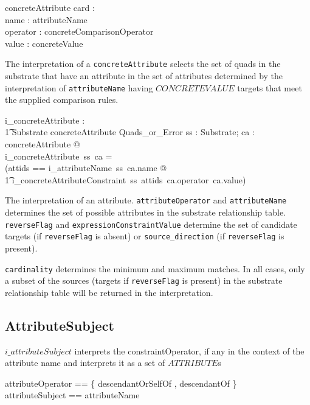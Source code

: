 \documentclass{article}
\def\spec#1{{\tt #1}}
\begin{document}
\begin{schema}{concreteAttribute}
	card : \optional[cardinality] \\
	name : attributeName \\
	operator : concreteComparisonOperator \\
	value : concreteValue
\end{schema}


The interpretation of a \spec{concreteAttribute} selects the set of quads in the substrate that have an attribute in the set of attributes 
determined by the interpretation of \spec{attributeName} having $CONCRETEVALUE$ targets that meet the supplied comparison rules.

\begin{gendef}
   i\_concreteAttribute : \\
\t1 Substrate \fun concreteAttribute \fun Quads\_or\_Error
\where
   \forall ss : Substrate; ca : concreteAttribute @ \\
   i\_concreteAttribute~ss~ca = \\
   (\LET attids == i\_attributeName~ss~ca.name @ \\
\t1 i\_concreteAttributeConstraint~ss~attids~ca.operator~ca.value)
\end{gendef}




   
   


The interpretation of an attribute.  \spec{attributeOperator} and \spec{attributeName}
determines the set of possible attributes in the substrate relationship table.  \spec{reverseFlag} and
\spec{expressionConstraintValue} determine the set of candidate targets (if \spec{reverseFlag}
is absent) or \spec{source\_direction} (if \spec{reverseFlag} is present).

\spec{cardinality} determines the minimum and maximum matches.  In all cases, only a subset of the sources 
(targets if \spec{reverseFlag} is present) in the substrate relationship table will be returned in the interpretation.

\subsection{AttributeSubject}

$i\_attributeSubject$ interprets the constraintOperator, if any in the context of the attribute name and
interprets it as a set of $ATTRIBUTE$s

\begin{zed}

attributeOperator ==  \{ descendantOrSelfOf , descendantOf \} \\
attributeSubject == \optional[attributeOperator] \cross attributeName 
\end{zed}
\end{document}

